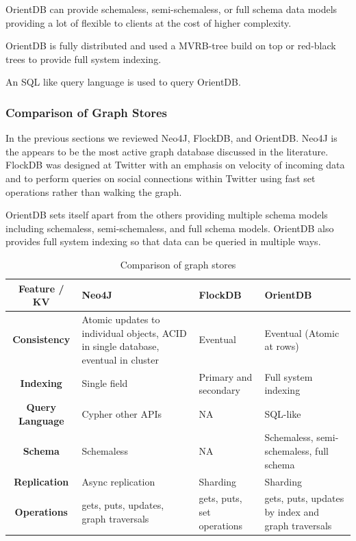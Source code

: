 \documentclass[]{article}
\begin{document}
OrientDB can provide schemaless, semi-schemaless, or full schema data models providing a lot of flexible to clients at the cost of higher complexity.

OrientDB is fully distributed and used a MVRB-tree build on top or red-black trees to provide full system indexing.

An SQL like query language is used to query OrientDB.

\subsubsection{Comparison of Graph Stores}
In the previous sections we reviewed Neo4J, FlockDB, and OrientDB. Neo4J is the appears to be the most active graph database discussed in the literature. FlockDB was designed at Twitter with an emphasis on velocity of incoming data and to perform queries on social connections within Twitter using fast set operations rather than walking the graph.

OrientDB sets itself apart from the others providing multiple schema models including schemaless, semi-schemaless, and full schema models. OrientDB also provides full system indexing so that data can be queried in multiple ways.

\begin{table}
    \begin{adjustbox}{center} 
        \begin{tabulary}{1.3\linewidth}{|c|L|L|L|}
            \hline 
            \textbf{Feature / KV} & \textbf{Neo4J} & \textbf{FlockDB} & \textbf{OrientDB} \\
            \hline 
            \textbf{Consistency} & Atomic updates to individual objects, ACID in single database, eventual in cluster & Eventual & Eventual  (Atomic at rows)\\ 
            \hline 
            \textbf{Indexing} & Single field & Primary and secondary & Full system indexing\\ 
            \hline 
            \textbf{Query Language} & Cypher other APIs & NA & SQL-like\\
            \hline 
            \textbf{Schema} & Schemaless & NA & Schemaless, semi-schemaless, full schema \\
            \hline
            \textbf{Replication} & Async replication & Sharding & Sharding  \\ 
            \hline 
            \textbf{Operations} & gets, puts, updates, graph traversals & gets, puts, set operations &  gets, puts, updates by index and graph traversals \\ 
            \hline 
        \end{tabulary} 
    \end{adjustbox}
    \caption{Comparison of graph stores}
    \label{table:graph-comparison}
\end{table}
\end{document}

